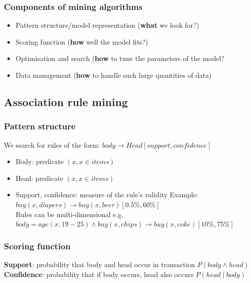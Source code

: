 \subsubsection{Components of mining algorithms}
\begin{itemize}
\item Pattern structure/model representation (\textbf{what} we look for?)
\item Scoring function (\textbf{how} well the model fits?)
\item Optimisation and search (\textbf{how} to tune the parameters of
  the model?
\item Data management (\textbf{how} to handle such large quantities of
  data)
\end{itemize}

\subsection{Association rule mining}
\subsubsection{Pattern structure}

We search for rules of the form: $ body \rightarrow Head[support,
confidence] $
\begin{itemize}
\item Body: predicate $ (x, x \in {items}) $
\item Head: predicate $ (x, x \in {items}) $
\item Support, confidence: measure of the rule's validity
  Example: $ buy(x, {diapers}) \rightarrow buy(x, {beer})[0.5\%, 60\%]
  $ \\
  Rules can be multi-dimensional e.g.\ $ body = age(x, {19-25}) \land
  buy(x, {chips}) \rightarrow buy(x, {coke})[10\%, 75\%] $
\end{itemize}

\subsubsection{Scoring function}

\textbf{Support}: probability that body and head occur in transaction
$ P(body \land head) $ \\
\textbf{Confidence}: probability that if body occurs, head also occurs
$ P(head \mid body) $

